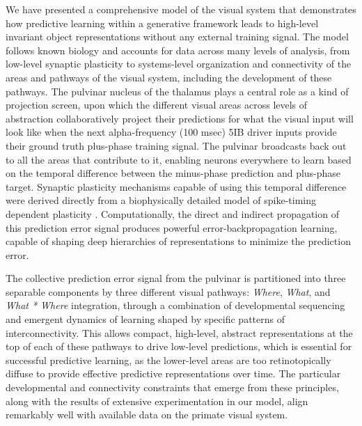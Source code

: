 \documentclass[11pt,twoside]{article}
\newif\myifpdf
\begin{document}
We have presented a comprehensive model of the visual system that demonstrates how predictive learning within a generative framework leads to high-level invariant object representations without any external training signal.  The model follows known biology and accounts for data across many levels of analysis, from low-level synaptic plasticity to systems-level organization and connectivity of the areas and pathways of the visual system, including the development of these pathways.  The pulvinar nucleus of the thalamus plays a central role as a kind of projection screen, upon which the different visual areas across levels of abstraction collaboratively project their predictions for what the visual input will look like when the next alpha-frequency (100 msec) 5IB driver inputs provide their ground truth plus-phase training signal.  The pulvinar broadcasts back out to all the areas that contribute to it, enabling neurons everywhere to learn based on the temporal difference between the minus-phase prediction and plus-phase target.  Synaptic plasticity mechanisms capable of using this temporal difference were derived directly from a biophysically detailed model of spike-timing dependent plasticity \cite{UrakuboHondaFroemkeEtAl08}.  Computationally, the direct and indirect propagation of this prediction error signal produces powerful error-backpropagation learning, capable of shaping deep hierarchies of representations to minimize the prediction error.

The collective prediction error signal from the pulvinar is partitioned into three separable components by three different visual pathways: {\em Where}, {\em What}, and {\em What * Where} integration, through a combination of developmental sequencing and emergent dynamics of learning shaped by specific patterns of interconnectivity.  This allows compact, high-level, abstract representations at the top of each of these pathways to drive low-level predictions, which is essential for successful predictive learning, as the lower-level areas are too retinotopically diffuse to provide effective predictive representations over time.  The particular developmental and connectivity constraints that emerge from these principles, along with the results of extensive experimentation in our model, align remarkably well with available data on the primate visual system.  

\end{document}
